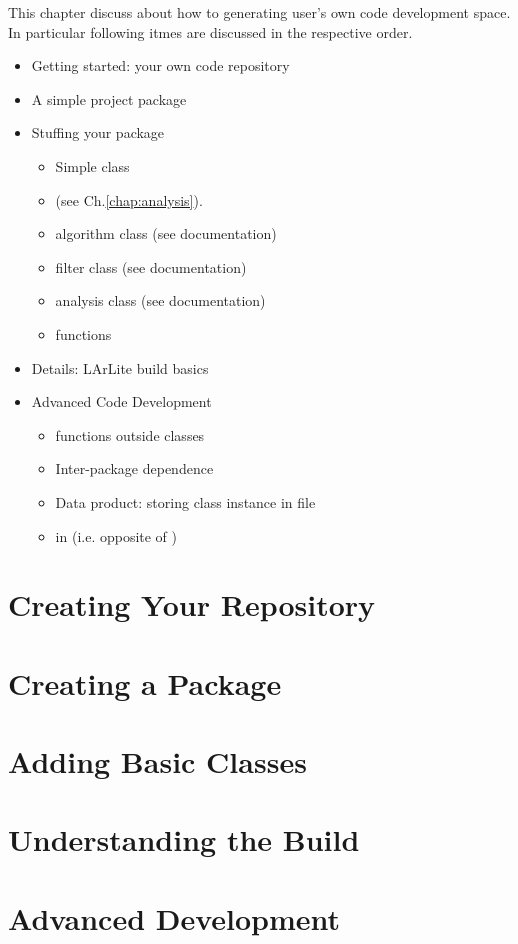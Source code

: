 
This chapter discuss about how to generating user's own code development space.
In particular following itmes are discussed in the respective order.
\begin{itemize}
\item Getting started: your own code repository
\item A simple \CPP project package 
\item Stuffing your package
\begin{itemize}
  \item Simple \CPP class
  \item \anaunit (see Ch.\ref{chap:analysis}).
  \item \ertool algorithm class (see \ertool documentation)
  \item \ertool filter class (see \ertool documentation)
  \item \ertool analysis class (see \ertool documentation)
  \item \CPP functions
\end{itemize}
\item Details: LArLite build basics
\item Advanced Code Development
\begin{itemize}
  \item \CPP functions outside classes
  \item Inter-package dependence
  \item Data product: storing \CPP class instance in \ROOT file
  \item \python in \CPP (i.e. opposite of \PyROOT)
\end{itemize}
\end{itemize}

\section{Creating Your Repository}
\label{sec:devrepo}


\section{Creating a Package}
\label{sec:package}


\section{Adding Basic \CPP Classes}
\label{sec:expand_package}


\section{Understanding the Build}
\label{sec:build_package}


\section{Advanced Development}
\label{sec:advanced_package}


